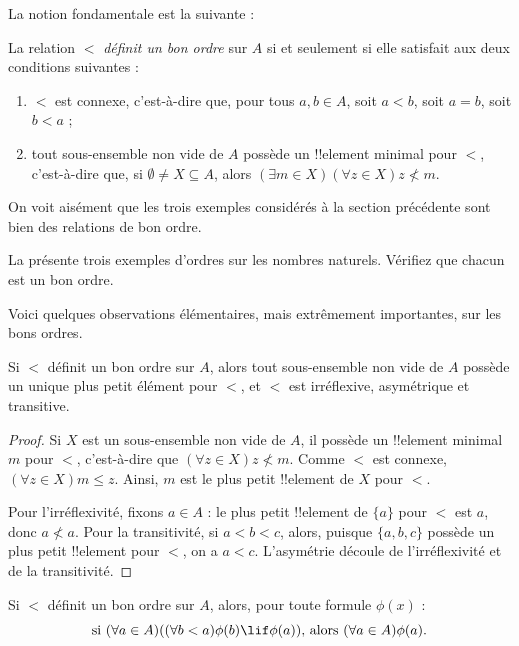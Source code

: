 \documentclass[../../../include/open-logic-section]{subfiles}
\begin{document}

La notion fondamentale est la suivante :

\begin{defn}
La relation $<$ \emph{définit un bon ordre} sur $A$ si et seulement si
elle satisfait aux deux conditions suivantes :
\begin{enumerate}
	\item $<$ est connexe, c'est-à-dire que, pour tous $a, b \in A$,
	soit $a < b$, soit $a = b$, soit $b < a$ ;
	\item tout sous-ensemble non vide de $A$ possède un !!{element}
	minimal pour $<$, c'est-à-dire que, si $\emptyset \neq X \subseteq A$,
	alors $(\exists m \in X)(\forall z \in X)z \nless m$.
\end{enumerate}
\end{defn}

On voit aisément que les trois exemples considérés à la section
précédente sont bien des relations de bon ordre.

\begin{prob}
La  présente trois exemples d'ordres
sur les nombres naturels. Vérifiez que chacun est un bon ordre.
\end{prob}

Voici quelques observations élémentaires, mais extrêmement importantes,
sur les bons ordres.

\begin{prop}
Si $<$ définit un bon ordre sur $A$, alors tout sous-ensemble non vide
de $A$ possède un unique plus petit élément pour $<$, et $<$ est
irréflexive, asymétrique et transitive.
\end{prop}

\begin{proof}
Si $X$ est un sous-ensemble non vide de $A$, il possède un !!{element}
minimal $m$ pour $<$, c'est-à-dire que $(\forall z \in X)z \nless m$.
Comme $<$ est connexe, $(\forall z \in X)m \leq z$. Ainsi, $m$ est le
plus petit !!{element} de $X$ pour $<$.

Pour l'irréflexivité, fixons $a \in A$ : le plus petit !!{element} de
$\{a\}$ pour $<$ est $a$, donc $a \nless a$. Pour la transitivité,
si $a < b < c$, alors, puisque $\{a, b, c\}$ possède un plus petit
!!{element} pour $<$, on a $a < c$. L'asymétrie découle de
l'irréflexivité et de la transitivité.
\end{proof}

\begin{prop}
Si $<$ définit un bon ordre sur $A$, alors, pour toute formule $\phi(x)$ :
\[
	\text{si }(\forall a \in A)((\forall b < a)\phi(b) \lif
		\phi(a))\text{, alors }(\forall a \in A)\phi(a).
\]
\end{prop}
\end{document}
